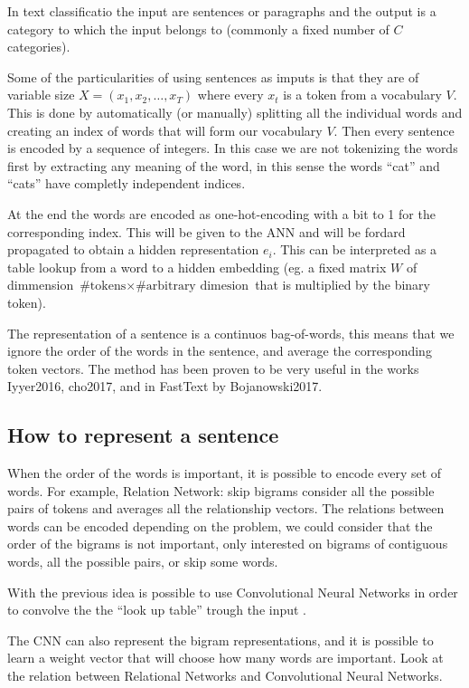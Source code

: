 \documentclass[b5paper]{report}
\begin{document}
In text classificatio the input are sentences or paragraphs and the output is a
category to which the input belongs to (commonly a fixed number of $C$
categories).

Some of the particularities of using sentences as imputs is that they are of
variable size $X = (x_1, x_2, \dots , x_T)$ where every $x_t$ is a token from
a vocabulary $V$. This is done by automatically (or manually) splitting all the
individual words and creating an index of words that will form our vocabulary
$V$. Then every sentence is encoded by a sequence of integers. In this case we
are not tokenizing the words first by extracting any meaning of the word, in
this sense the words ``cat'' and ``cats'' have completly independent indices.

At the end the words are encoded as one-hot-encoding with a bit to 1 for the
corresponding index. This will be given to the \gls{ANN} and will be fordard
propagated to obtain a hidden representation $e_i$. This can be interpreted as
a table lookup from a word to a hidden embedding (eg. a fixed matrix $W$ of
  dimmension $\text{\#tokens} \times \text{\#arbitrary dimesion}$ that is
multiplied by the binary token).

The representation of a sentence is a continuos bag-of-words, this means that
we ignore the order of the words in the sentence, and average the corresponding
token vectors. The method has been proven to be very useful in the works
Iyyer2016, cho2017, and in FastText by Bojanowski2017.

\subsection{How to represent a sentence}

When the order of the words is important, it is possible to encode every set of
words. For example, Relation Network: skip bigrams consider all the possible
pairs of tokens and averages all the relationship vectors. The relations
between words can be encoded depending on the problem, we could consider that
the order of the bigrams is not important, only interested on bigrams of
contiguous words, all the possible pairs, or skip some words.

With the previous idea is possible to use Convolutional Neural Networks in
order to convolve the the ``look up table'' trough the input
\cite{kim2014convolutional}.

The CNN can also represent the bigram representations, and it is possible to
learn a weight vector that will choose how many words are important. Look at
the relation between Relational Networks and Convolutional Neural Networks.
\end{document}
